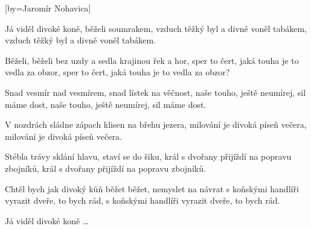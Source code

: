 [by={Jaromír Nohavica}]

\beginverse{}
\lrep{} Já viděl divoké koně, běželi soumrakem, \rrep{}
vzduch těžký byl a divně voněl  tabákem,
vzduch těžký byl a divně voněl tabákem.
\endverse{}

\beginverse{}
\lrep{} Běželi, běželi bez uzdy a sedla krajinou řek a hor, \rrep{}
sper to čert, jaká touha je to vedla za obzor,
sper to čert, jaká touha je to vedla za obzor?
\endverse{}

\beginverse{}
\lrep{} Snad vesmír nad vesmírem, snad lístek na věčnost, \rrep{}
naše touho, ještě neumírej, sil máme dost,
naše touho, ještě neumírej, sil máme dost.
\endverse{}

\beginverse{}
\lrep{} V nozdrách sládne zápach klisen na břehu jezera, \rrep{}
milování je divoká píseň večera,
milování je divoká píseň večera.
\endverse{}

\beginverse{}
\lrep{} Stébla trávy sklání hlavu, staví se do šiku, \rrep{}
král s dvořany přijíždí na popravu zbojníků,
král s dvořany přijíždí na popravu zbojníků.
\endverse{}

\beginverse{}
\lrep{} Chtěl bych jak divoký kůň běžet běžet, nemyslet na návrat \rrep{}
s koňskými handlíři vyrazit dveře, to bych rád,
s koňskými handlíři vyrazit dveře, to bych rád.
\endverse{}

\beginverse{}
Já viděl divoké koně \ldots{}
\endverse{}

\endsong{}
